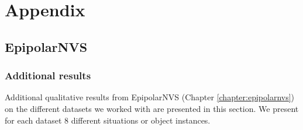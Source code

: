 \chapter{Appendix}
\label{chapter:appendix}

{}


\section{EpipolarNVS}
\subsection{Additional results}

Additional qualitative results from EpipolarNVS (Chapter \ref{chapter:epipolarnvs}) on the different datasets we worked with are presented in this section. We present for each dataset 8 different situations or object instances. 

